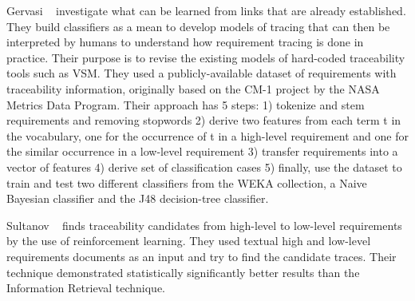 Gervasi \etal~\cite{Gervasi:2011} investigate what can be learned from links that are already established. They build classifiers as a mean to develop models of tracing that can then be interpreted by humans to understand how requirement tracing is done in practice. Their purpose is to revise the existing models of hard-coded traceability tools such as VSM. 
They used a publicly-available dataset of requirements with traceability information, originally based on the CM-1 project by the NASA Metrics Data Program. Their approach has 5 steps: 1) tokenize and stem requirements and removing stopwords 2) derive two features from each term t in the vocabulary, one for the occurrence of t in a high-level requirement and one for the similar occurrence in a low-level requirement 3) transfer requirements into a vector of features 4) derive set of classification cases 5) finally,  use the dataset to train and test two different classifiers from the WEKA collection, a Naive Bayesian classifier and the J48 decision-tree classifier.\newline

Sultanov \etal~\cite{Sultanov:2013} finds traceability candidates from high-level to low-level requirements by the use of reinforcement learning. They used textual high and low-level requirements documents as an input and try to find the candidate traces. Their technique demonstrated statistically significantly better results than the Information Retrieval technique. 





